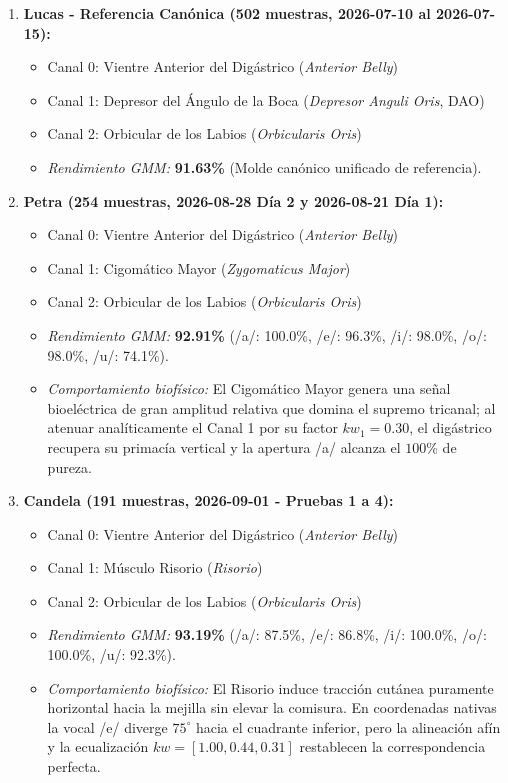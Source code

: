 \documentclass[11pt,a4paper,openany]{book}
\theoremstyle{definition}
\begin{document}
\begin{enumerate}
    \item \textbf{Lucas - Referencia Canónica (502 muestras, 2026-07-10 al 2026-07-15):}
    \begin{itemize}
        \item Canal 0: Vientre Anterior del Digástrico (\textit{Anterior Belly})
        \item Canal 1: Depresor del Ángulo de la Boca (\textit{Depresor Anguli Oris}, DAO)
        \item Canal 2: Orbicular de los Labios (\textit{Orbicularis Oris})
        \item \textit{Rendimiento GMM:} \textbf{91.63\%} (Molde canónico unificado de referencia).
    \end{itemize}

    \item \textbf{Petra (254 muestras, 2026-08-28 Día 2 y 2026-08-21 Día 1):}
    \begin{itemize}
        \item Canal 0: Vientre Anterior del Digástrico (\textit{Anterior Belly})
        \item Canal 1: Cigomático Mayor (\textit{Zygomaticus Major})
        \item Canal 2: Orbicular de los Labios (\textit{Orbicularis Oris})
        \item \textit{Rendimiento GMM:} \textbf{92.91\%} (/a/: 100.0\%, /e/: 96.3\%, /i/: 98.0\%, /o/: 98.0\%, /u/: 74.1\%).
        \item \textit{Comportamiento biofísico:} El Cigomático Mayor genera una señal bioeléctrica de gran amplitud relativa que domina el supremo tricanal; al atenuar analíticamente el Canal 1 por su factor $kw_1 = 0.30$, el digástrico recupera su primacía vertical y la apertura /a/ alcanza el $100\%$ de pureza.
    \end{itemize}

    \item \textbf{Candela (191 muestras, 2026-09-01 - Pruebas 1 a 4):}
    \begin{itemize}
        \item Canal 0: Vientre Anterior del Digástrico (\textit{Anterior Belly})
        \item Canal 1: Músculo Risorio (\textit{Risorio})
        \item Canal 2: Orbicular de los Labios (\textit{Orbicularis Oris})
        \item \textit{Rendimiento GMM:} \textbf{93.19\%} (/a/: 87.5\%, /e/: 86.8\%, /i/: 100.0\%, /o/: 100.0\%, /u/: 92.3\%).
        \item \textit{Comportamiento biofísico:} El Risorio induce tracción cutánea puramente horizontal hacia la mejilla sin elevar la comisura. En coordenadas nativas la vocal /e/ diverge $75^\circ$ hacia el cuadrante inferior, pero la alineación afín y la ecualización $kw = [1.00, 0.44, 0.31]$ restablecen la correspondencia perfecta.
    \end{itemize}


\end{enumerate}
\end{document}

